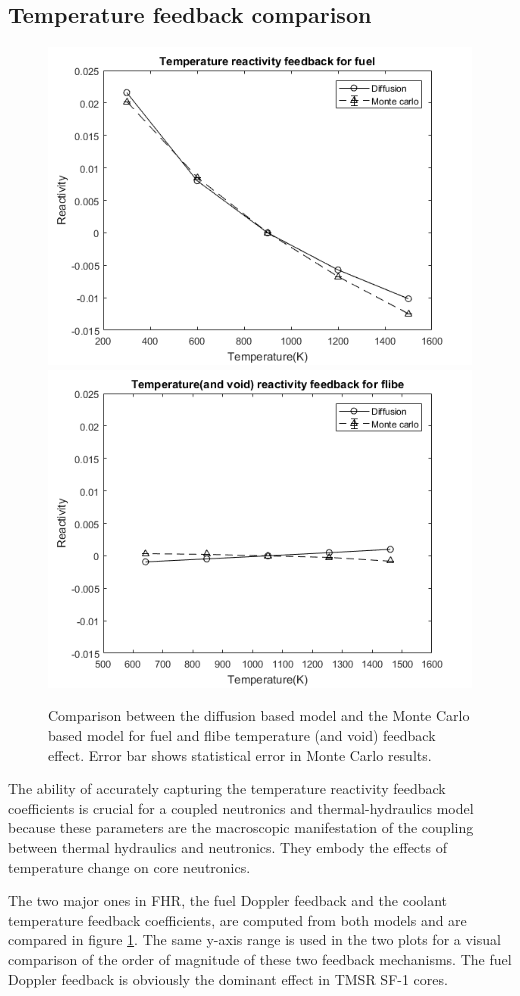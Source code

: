 \documentclass{elsarticle}
\begin{document}
\subsection{Temperature feedback comparison}
\label{sec:feedback}

\begin{figure}
  \centering
  \includegraphics[width=0.6\columnwidth]{./images/benchmark/feedback_fuel.png}
  \includegraphics[width=0.6\columnwidth]{./images/benchmark/feedback_flibe.png}
  \caption{Comparison between the diffusion based model and the Monte Carlo based model for fuel and flibe temperature (and void) feedback effect. Error bar shows statistical error in Monte Carlo results.} 
  \label{fig:fuel_feedback}
\end{figure}



The ability of accurately capturing the temperature reactivity feedback coefficients is crucial for a coupled neutronics and thermal-hydraulics model because these parameters are the macroscopic manifestation of the coupling between thermal hydraulics and neutronics. They embody the effects of temperature change on core neutronics. 

The two major ones in FHR, the fuel Doppler feedback and the coolant temperature feedback coefficients, are computed from both models and are compared in figure \ref{fig:fuel_feedback}. The same y-axis range is used in the two plots for a visual comparison of the order of magnitude of these two feedback mechanisms. The fuel Doppler feedback is obviously the dominant effect in TMSR SF-1 cores.
\end{document}
